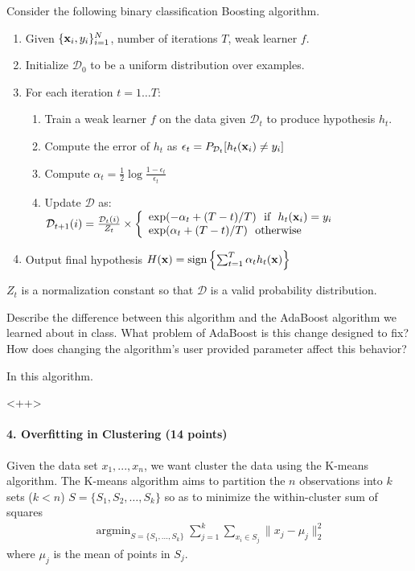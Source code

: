 \documentclass{article}
\newcommand{\vx}{{\bf x}}
\newcommand{\vxi}{{\bf x}_i}
\newcommand{\yi}{y_i}
\newcommand{\D}{\mathcal{D}}
\begin{document}
Consider the following binary classification Boosting algorithm.
\begin{enumerate}
	\item Given $\{\vxi, \yi\}_{i=1}^N$, number of iterations $T$, weak learner $f$.
	\item Initialize $\D_0$ to be a uniform distribution over examples.
	\item For each iteration $t = 1 \ldots T$:
		\begin{enumerate}
			\item Train a weak learner $f$ on the data given $\D_t$ to produce hypothesis $h_t$.
			\item Compute the error of $h_t$ as $\epsilon_t = P_{\D_t} [h_t(\vxi) \ne \yi]$
			\item Compute $\alpha_t = \frac{1}{2} \log \frac{1-\epsilon_t}{\epsilon_t}$
			\item Update $\D$ as:\\
				$\D_{t+1}(i) = \frac{\D_t(i)}{Z_t} \times \left\{
					\begin{array}{lr}
						\exp(-\alpha_t + (T-t) / T) ~~  \textrm{if} ~~ h_t(\vxi) = \yi  \\
						\exp(\alpha_t + (T-t) / T) ~~ \textrm{otherwise}
					\end{array}
					\right.$
		\end{enumerate}
	\item Output final hypothesis $H(\vx)=\textrm{sign} \left\{ \sum_{t=1}^T \alpha_t h_t(\vx) \right\}$
	\end{enumerate}

	$Z_t$ is a normalization constant so that $\D$ is a valid probability distribution.

	Describe the difference between this algorithm and the AdaBoost algorithm we learned about in class. What problem of AdaBoost is this change designed to fix? How does changing the algorithm's user provided parameter affect this behavior?
	\begin{soln}
		In this algorithm.
	\end{soln}<++>

	\paragraph{4. Overfitting in Clustering (14 points)}

	Given the data set $x_1,...,x_n$, we want cluster the data using the K-means algorithm. The K-means algorithm aims to partition the $n$ observations into $k$ sets ($k < n$) $S = \{S_1, S_2, \ldots, S_k\}$ so as to minimize the within-cluster sum of squares
	\begin{eqnarray}
		\mathop{\textrm{argmin}}_{S=\{S_1,...,S_k\}}\sum_{j=1}^k\sum_{x_i\in S_j}\|x_j-\mu_j\|_2^2
		\label{objective1}
	\end{eqnarray}
	where $\mu_j$ is the mean of points in $S_j$.
\end{document}
